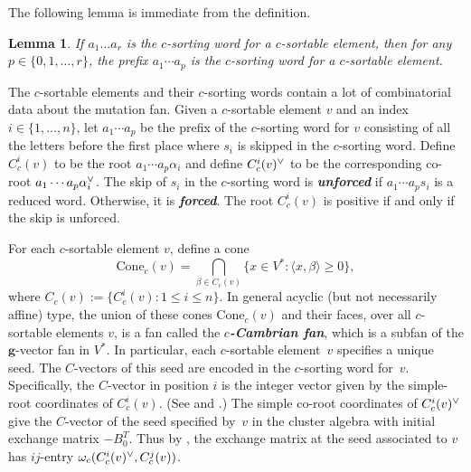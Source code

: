 \documentclass{amsart}
\newtheorem{lemma}[proposition]{Lemma}
\theoremstyle{definition}
\theoremstyle{remark}
\numberwithin{equation}{section}
\newcommand{\newword}[1]{\textbf{\emph{#1}}}
\newcommand{\set}[1]{{\lbrace #1 \rbrace}}
\newcommand{\br}[1]{{\langle #1 \rangle}}
\newcommand{\ck}{\spcheck}
\newcommand{\0}{{\mathbf{0}}}
\newcommand{\Cone}{\mathrm{Cone}}
\newcommand{\g}{\mathbf{g}}
\newcommand{\RSChar}{\Phi}
\newcommand{\RS}{\RSChar}
\begin{document}
The following lemma is immediate from the definition.
\begin{lemma}\label{any prefix}
If $a_1\ldots a_r$ is the $c$-sorting word for a $c$-sortable element, then for any $p\in\set{0,1,\ldots,r}$, the prefix $a_1\cdots a_p$ is the $c$-sorting word for a $c$-sortable element.
\end{lemma}


The $c$-sortable elements and their $c$-sorting words contain a lot of combinatorial data about the mutation fan.
Given a $c$-sortable element $v$ and an index $i\in\set{1,\ldots,n}$, let $a_1\cdots a_p$ be the prefix of the $c$-sorting word for $v$ consisting of all the letters before the first place where $s_i$ is skipped in the $c$-sorting word.
Define $C_c^i(v)$ to be the root $a_1\cdots a_p\alpha_i$ and define $C_c^i(v)\ck$ to be the corresponding co-root $a_1\cdots a_p\alpha\ck_i$.
The skip of $s_i$ in the $c$-sorting word is \newword{unforced} if $a_1\cdots a_ps_i$ is a reduced word.
Otherwise, it is \newword{forced}.
The root $C_c^i(v)$ is positive if and only if the skip is unforced.

For each $c$-sortable element $v$, define a cone  
\[\Cone_c(v)=\bigcap_{\beta \in C_c(v)}\set{x\in V^*:\br{x,\beta} \geq 0},\]
where $C_c(v):=\{C_c^i(v):1\le i\le n\}$.
In general acyclic (but not necessarily affine) type, the union of these cones $\Cone_c(v)$ and their faces, over all $c$-sortable elements $v$, is a fan called the \newword{$c$-Cambrian fan}, which is a subfan of the $\g$-vector fan in $V^*$.
In particular, each $c$-sortable element~$v$ specifies a unique seed.
The $C$-vectors of this seed are encoded in the $c$-sorting word for~$v$.
Specifically, the $C$-vector in position $i$ is the integer vector given by the simple-root coordinates of $C_c^i(v)$.
(See \cite[Therem~1.1]{framework} and \cite[Theorem~5.12]{framework}.)
The simple co-root coordinates of $C_c^i(v)\ck$ give the $C$-vector of the seed specified by~$v$ in the cluster algebra with initial exchange matrix $-B_0^T$.
Thus by \cite[Theorem~1.1]{framework}, the exchange matrix at the seed associated to $v$ has $ij$-entry $\omega_c(C_c^i(v)\ck,C_c^j(v))$.
\end{document}
